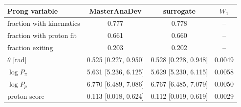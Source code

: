\begin{tabular}{lccc}
\toprule
Prong variable & MasterAnaDev & surrogate & $W_1$ \\
\midrule
fraction with kinematics & 0.777 & 0.778 & -- \\
fraction with proton fit & 0.661 & 0.660 & -- \\
fraction exiting & 0.203 & 0.202 & -- \\
$\theta$ [rad] & 0.525 [0.227, 0.950] & 0.528 [0.228, 0.948] & 0.0049 \\
$\log P_\pi$ & 5.631 [5.236, 6.125] & 5.629 [5.230, 6.115] & 0.0058 \\
$\log P_p$ & 6.770 [6.489, 7.086] & 6.767 [6.485, 7.079] & 0.0050 \\
proton score & 0.113 [0.018, 0.624] & 0.112 [0.019, 0.619] & 0.0029 \\
\bottomrule
\end{tabular}
